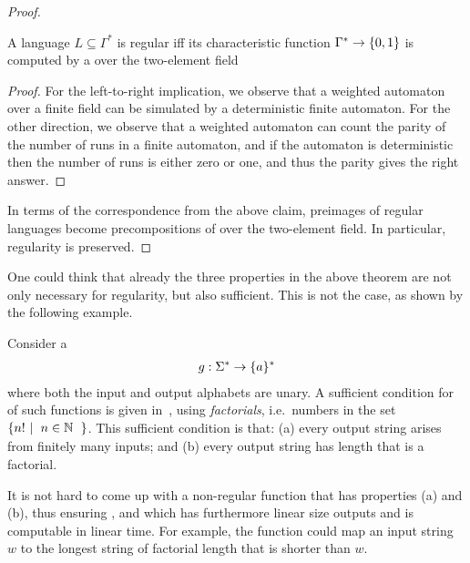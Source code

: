 \begin{proof}
        \begin{claim}\label{claim:regular-weighted-automata}
            A language $L \subseteq \Gamma^*$ is regular iff its characteristic
            function $\Gamma^* \to \{0,1\}$ is computed by a  over the two-element field 
        \end{claim}
        \begin{proof}
            For the left-to-right implication, we observe that a weighted
            automaton over a finite field can be simulated by a deterministic
            finite automaton. For the other direction, we observe that a
            weighted automaton can count the parity of  the number of runs in a
            finite automaton, and if the automaton is deterministic then the
            number of runs is either zero or one, and thus the parity gives the
            right answer.
        \end{proof}

        In terms of the correspondence from the above claim, preimages of
        regular languages become precompositions of  over the
        two-element field. In particular, regularity is preserved. 
\end{proof}

One could think that already the three properties in the above theorem are not
only necessary for regularity, but also sufficient. This is not the case, as
shown by the following example.

\begin{myexample}[Factorials]
    \label{ex:not-regular-but-continuous-over-finite-fields}
    Consider a 
    \begin{align*}
    g : \Sigma^* \to \{a\}^*
    \end{align*}
    where both the input and output alphabets are unary. A sufficient condition 
    for  of such functions is given in~\cite[Example 2.12]{bojanczykTitoRegular23},
    using \emph{factorials}, i.e.~numbers in the set $\setbuild{n!}{$n \in \Nat$}$. 
    This sufficient condition is that: 
    (a) every output string arises from finitely many inputs; and
    (b) every output string has length that is a factorial. 

    It is not hard to come up with a non-regular function that has properties
    (a) and (b), thus ensuring , and which has furthermore
    linear size outputs and is computable in linear time. For example, the
    function could map an input string $w$ to the longest string of factorial
    length that is shorter than $w$. 
\end{myexample}
